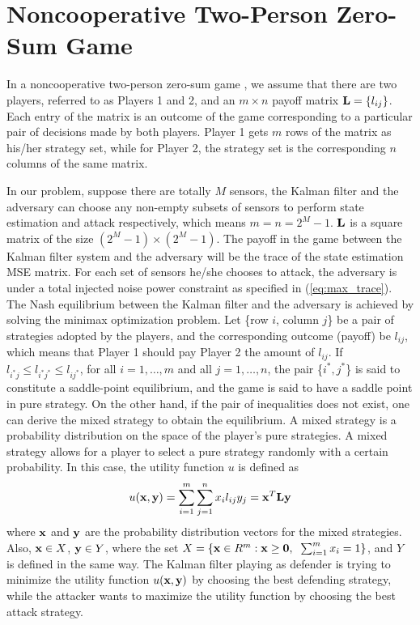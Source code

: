 \documentclass{article}
\begin{document}
\section{Noncooperative Two-Person Zero-Sum Game}

In a noncooperative two-person zero-sum game \cite{basar&olsder:book}, we assume that there are two players, referred to as Players 1 and  2, and an $m\times n $  payoff matrix ${\bf L}=\{l_{ij}\}$. Each entry of the matrix is an outcome of the game corresponding to a particular pair of decisions made by both players. Player 1 gets $m$ rows of the matrix as his/her strategy set, while for Player 2, the strategy set is the corresponding $n$ columns of the same matrix.
 
In our problem, suppose there are totally $M$ sensors, the Kalman filter and the adversary can choose any non-empty subsets of sensors to perform state estimation and attack respectively, which means $m=n=2^M-1$. ${\bf L}$ is a square matrix of the size $(2^M-1)\times (2^M-1)$. The payoff in the game between the Kalman filter system and the adversary will be the trace of the state estimation MSE matrix. For each set of sensors he/she chooses to attack,  the adversary is under a total injected noise power  constraint as  specified  in (\ref{eq:max_trace}). The Nash equilibrium between the Kalman filter and the adversary is achieved by solving the minimax optimization problem. 
Let \{row $i$, column $j$\} be a pair of strategies adopted by the players, and the corresponding outcome (payoff) be $l_{ij}$, which means that Player 1 should pay Player 2 the amount of $l_{ij}$. If $l_{i^*j}\le l_{i^*j^*}\le l_{ij^*}$, for all $i=1,\dots, m$ and all $j=1,\dots,n$, the pair \{$i^*,j^*$\} is  said to constitute a saddle-point equilibrium, and the game is said to have a saddle point in pure strategy. On the other hand,  if the pair of inequalities does not  exist, one can derive the mixed strategy to obtain the equilibrium. A mixed strategy is a probability distribution on the space of the player's pure strategies. A mixed strategy allows for a player to select a pure strategy randomly with a certain probability. In this case, the utility function $u$ is defined as
\begin{equation}
	u({\bf x},{\bf y})=\sum_{i=1}^{m}\sum_{j=1}^{n}x_il_{ij}y_j={\bf x}^{T} {\bf L} {\bf y}
\end{equation}
where ${\bf x}$ and ${\bf y}$ are the probability distribution vectors for the mixed strategies. Also, ${\bf x}\in X$, ${\bf y} \in Y$, where the set ${X}=\{{\bf x } \in R^m: {\bf x}\ge {\bf 0},\;\; \sum_{i=1}^{m}x_i=1\}$, and  ${Y}$ is defined in the same way. The Kalman filter playing as defender is trying to minimize the utility function $u({\bf x ,y})$ by choosing the best defending strategy, while the attacker wants to maximize the utility function  by choosing the best attack strategy. 
\end{document}
